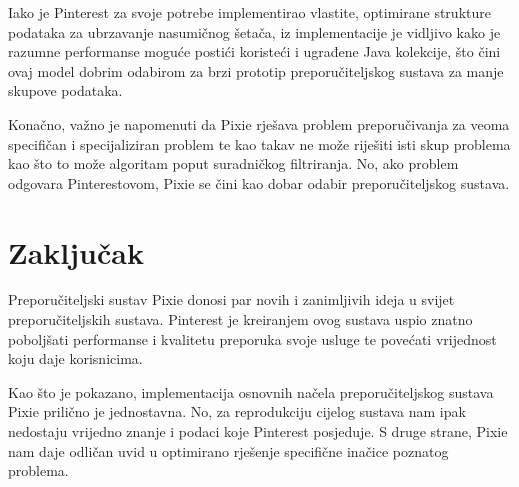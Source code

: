\documentclass[times, utf8, seminar]{fer}
\begin{document}
Iako je Pinterest za svoje potrebe implementirao vlastite, optimirane strukture podataka za ubrzavanje nasumičnog šetača, iz implementacije je vidljivo kako je razumne performanse moguće postići koristeći i ugrađene Java kolekcije, što čini ovaj model dobrim odabirom za brzi prototip preporučiteljskog sustava za manje skupove podataka.

Konačno, važno je napomenuti da Pixie rješava problem preporučivanja za veoma specifičan i specijaliziran problem te kao takav ne može riješiti isti skup problema kao što to može algoritam poput suradničkog filtriranja. No, ako problem odgovara Pinterestovom, Pixie se čini kao dobar odabir preporučiteljskog sustava.

\chapter{Zaključak}

Preporučiteljski sustav Pixie donosi par novih i zanimljivih ideja u svijet preporučiteljskih sustava. Pinterest je kreiranjem ovog sustava uspio znatno poboljšati performanse i kvalitetu preporuka svoje usluge te povećati vrijednost koju daje korisnicima.

Kao što je pokazano, implementacija osnovnih načela preporučiteljskog sustava Pixie prilično je jednostavna. No, za reprodukciju cijelog sustava nam ipak nedostaju vrijedno znanje i podaci koje Pinterest posjeduje. S druge strane, Pixie nam daje odličan uvid u optimirano rješenje specifične inačice poznatog problema.



\end{document}
